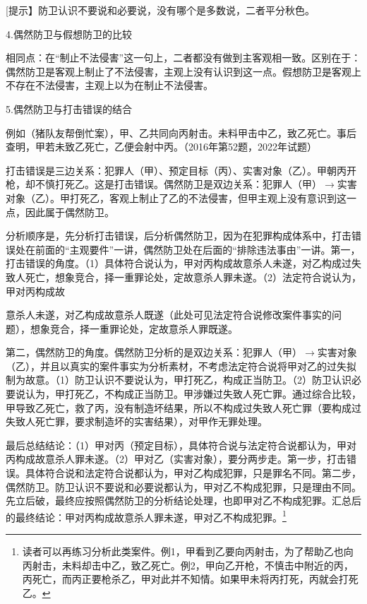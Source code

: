 [提示】防卫认识不要说和必要说，没有哪个是多数说，二者平分秋色。


4.偶然防卫与假想防卫的比较

相同点：在“制止不法侵害”这一句上，二者都没有做到主客观相一致。区别在于：偶然防卫是客观上制止了不法侵害，主观上没有认识到这一点。假想防卫是客观上不存在不法侵害，主观上以为在制止不法侵害。


5.偶然防卫与打击错误的结合

例如（猪队友帮倒忙案），甲、乙共同向丙射击。未料甲击中乙，致乙死亡。事后查明，甲若未致乙死亡，乙便会射中丙。（2016年第52题，2022年试题）

打击错误是三边关系：犯罪人（甲）、预定目标（丙）、实害对象（乙）。甲朝丙开枪，却不慎打死乙。这是打击错误。偶然防卫是双边关系：犯罪人（甲）\ensuremath{\rightarrow}实害对象（乙）。甲打死乙，客观上制止了乙的不法侵害，但甲主观上没有意识到这一点，因此属于偶然防卫。

分析顺序是，先分析打击错误，后分析偶然防卫，因为在犯罪构成体系中，打击错误处在前面的“主观要件”一讲，偶然防卫处在后面的“排除违法事由”一讲。第一，打击错误的角度。（1）具体符合说认为，甲对丙构成故意杀人未遂，对乙构成过失致人死亡，想象竞合，择一重罪论处，定故意杀人罪未遂。（2）法定符合说认为，甲对丙构成故

意杀人未遂，对乙构成故意杀人既遂（此处可见法定符合说修改案件事实的问题），想象竞合，择一重罪论处，定故意杀人罪既遂。

第二，偶然防卫的角度。偶然防卫分析的是双边关系：犯罪人（甲）\ensuremath{\rightarrow}实害对象（乙），并且以真实的案件事实为分析素材，不考虑法定符合说将甲对乙的过失拟制为故意。（1）防卫认识不要说认为，甲打死乙，构成正当防卫。（2）防卫认识必要说认为，甲打死乙，不构成正当防卫。甲涉嫌过失致人死亡罪。通过综合比较，甲导致乙死亡，救了丙，没有制造坏结果，所以不构成过失致人死亡罪（要构成过失致人死亡罪，要求制造坏的实害结果），对甲作无罪处理。

最后总结结论：（1）甲对丙（预定目标），具体符合说与法定符合说都认为，甲对丙构成故意杀人罪未遂。（2）甲对乙（实害对象），要分两步走。第一步，打击错误。具体符合说和法定符合说都认为，甲对乙构成犯罪，只是罪名不同。第二步，偶然防卫。防卫认识不要说和必要说都认为，甲对乙不构成犯罪，只是理由不同。先立后破，最终应按照偶然防卫的分析结论处理，也即甲对乙不构成犯罪。汇总后的最终结论：甲对丙构成故意杀人罪未遂，甲对乙不构成犯罪。\footnote{读者可以再练习分析此类案件。例1，甲看到乙要向丙射击，为了帮助乙也向丙射击，未料却击中乙，致乙死亡。例2，甲向乙开枪，不慎击中附近的丙，丙死亡，而丙正要枪杀乙，甲对此并不知情。如果甲未将丙打死，丙就会打死乙。}

